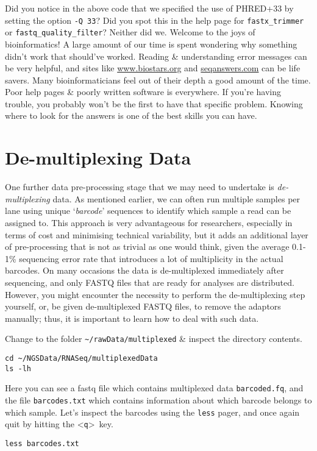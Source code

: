\begin{advanced}
Did you notice in the above code that we specified the use of PHRED+33 by setting the option \texttt{-Q 33}?
Did you spot this in the help page for \texttt{fastx\_trimmer} or \texttt{fastq\_quality\_filter}?
Neither did we.
Welcome to the joys of bioinformatics!
A large amount of our time is spent wondering why something didn't work that should've worked.
Reading \& understanding error messages can be very helpful, and sites like \url{www.biostars.org} and \url{seqanswers.com} can be life savers.
Many bioinformaticians feel out of their depth a good amount of the time.
Poor help pages \& poorly written software is everywhere.
If you're having trouble, you probably won't be the first to have that specific problem.
Knowing where to look for the answers is one of the best skills you can have.
\end{advanced}

\section{De-multiplexing Data}

\begin{note}
One further data pre-processing stage that we may need to undertake is \textit{de-multiplexing} data.
As mentioned earlier, we can often run multiple samples per lane using unique `\textit{barcode}' sequences to identify which sample a read can be assigned to.
This approach is very advantageous for researchers, especially in terms of cost and minimising technical variability, but it adds an additional layer of pre-processing that is not as trivial as one would think, given the average 0.1-1\% sequencing error rate that introduces a lot of multiplicity in the actual barcodes. 
On many occasions the data is de-multiplexed immediately after sequencing, and only FASTQ files that are ready for analyses are distributed. 
However, you might encounter the necessity to perform the de-multiplexing step yourself, or, be given de-multiplexed FASTQ files, to remove the adaptors manually; thus, it is important to learn how to deal with such data. \\
\end{note}

\begin{steps}
Change to the folder \texttt{\~{}/rawData/multiplexed} \& inspect the directory contents.
\begin{lstlisting}
cd ~/NGSData/RNASeq/multiplexedData
ls -lh
\end{lstlisting}
Here you can see a fastq file which contains multiplexed data \texttt{barcoded.fq}, and the file \texttt{barcodes.txt} which contains information about which barcode belongs to which sample.
Let's inspect the barcodes using the \texttt{less} pager, and once again quit by hitting the \textless \texttt{q}\textgreater ~key.
\begin{lstlisting}
less barcodes.txt
\end{lstlisting}
\end{steps}

